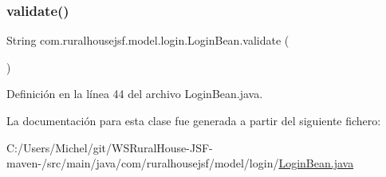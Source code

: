 \subsubsection{\texorpdfstring{validate()}{validate()}}
{\footnotesize\ttfamily String com.\+ruralhousejsf.\+model.\+login.\+Login\+Bean.\+validate (\begin{DoxyParamCaption}{ }\end{DoxyParamCaption})}



Definición en la línea 44 del archivo Login\+Bean.\+java.



La documentación para esta clase fue generada a partir del siguiente fichero\+:\begin{DoxyCompactItemize}
\item 
C\+:/\+Users/\+Michel/git/\+W\+S\+Rural\+House-\/\+J\+S\+F-\/maven-\//src/main/java/com/ruralhousejsf/model/login/\mbox{\hyperlink{_login_bean_8java}{Login\+Bean.\+java}}\end{DoxyCompactItemize}
